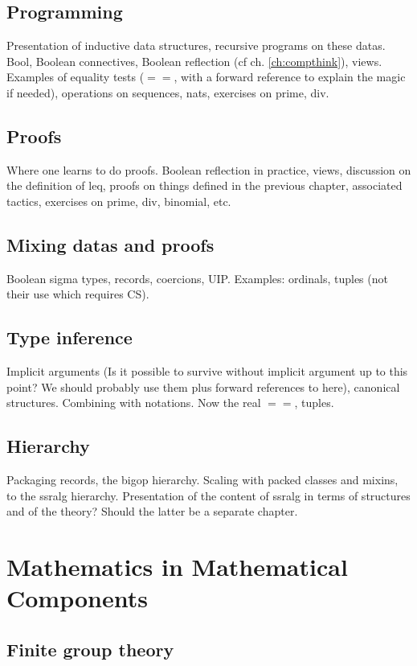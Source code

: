 \documentclass{book}
\begin{document}
\chapter{Programming}

Presentation of inductive data structures, recursive programs on these
datas.
Bool, Boolean connectives, Boolean reflection (cf
ch. \ref{ch:compthink}), views.
Examples of equality tests ($==$, with a forward reference to
explain the magic if needed), operations on sequences, nats,
exercises on prime, div.

\chapter{Proofs}

Where one learns to do proofs.
Boolean reflection in practice, views, discussion on the definition of leq,
proofs on things defined in the
previous chapter, associated tactics, exercises on prime, div,
binomial, etc.

\chapter{Mixing datas and proofs}
Boolean sigma types, records, coercions, UIP. Examples: ordinals,
tuples (not their use which requires CS).

\chapter{Type inference}

Implicit arguments (Is it possible to survive without implicit
argument up to this point? We should probably use them plus forward
references to here), canonical structures. Combining with
notations. Now the real $==$, tuples.
\chapter{Hierarchy}
Packaging records, the bigop hierarchy.
Scaling with packed classes and mixins, to the ssralg
hierarchy. Presentation of the content of ssralg in terms of structures
and of the theory? Should the latter be a separate chapter.

\part{Mathematics in Mathematical Components}

\chapter{Finite group theory}
\end{document}
